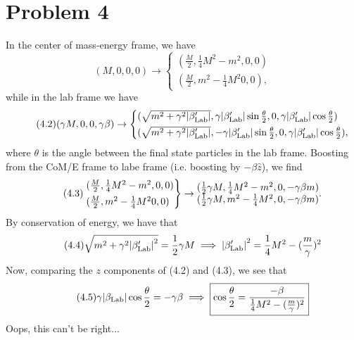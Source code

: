 \documentclass[12pt]{article}
\begin{document}
\section*{Problem 4}
In the center of mass-energy frame, we have 
\begin{equation*} \tag{4.1}
    (M, 0, 0, 0) \rightarrow 
    \begin{cases*}
        (\frac{M}{2}, \frac{1}{4}M^2 - m^2, 0, 0) \\
        (\frac{M}{2}, m^2 - \frac{1}{4}M^2 0, 0),    
    \end{cases*}
\end{equation*}
while in the lab frame we have
\begin{equation*} \tag{4.2}
    (\gamma M, 0, 0, \gamma\beta) \rightarrow 
    \begin{cases*}
        (\sqrt{m^2 + \gamma^2\abs{\beta_\text{Lab}'}}, \gamma\abs{\beta_\text{Lab}'}\sin\frac{\theta}{2}, 0, \gamma\abs{\beta_\text{Lab}'}\cos\frac{\theta}{2}) \\
        (\sqrt{m^2 + \gamma^2\abs{\beta_\text{Lab}'}}, -\gamma\abs{\beta_\text{Lab}'}\sin\frac{\theta}{2}, 0, \gamma\abs{\beta_\text{Lab}'}\cos\frac{\theta}{2}),
    \end{cases*}
\end{equation*}
where $\theta$ is the angle between the final state particles in the lab frame. Boosting from the CoM/E frame to labe frame (i.e. boosting by $-\beta \hat{z}$), we find
\begin{equation*} \tag{4.3}
    \begin{rcases*}
        (\frac{M}{2}, \frac{1}{4}M^2 - m^2, 0, 0) \\
        (\frac{M}{2}, m^2 - \frac{1}{4}M^2 0, 0)  
    \end{rcases*} 
    \rightarrow \mqty{(\frac{1}{2}\gamma M, \frac{1}{4}M^2 - m^2, 0, -\gamma\beta m) \\ (\frac{1}{2}\gamma M, m^2 - \frac{1}{4}M^2, 0, -\gamma\beta m)}.
\end{equation*}
By conservation of energy, we have that 
\begin{equation*} \tag{4.4}
    \sqrt{m^2 + \gamma^2\abs{\beta_\text{Lab}'}^2} = \frac{1}{2}\gamma M \implies \abs{\beta_\text{Lab}'}^2 = \frac{1}{4}M^2 - (\frac{m}{\gamma})^2
\end{equation*}
Now, comparing the $z$ components of (4.2) and (4.3), we see that
\begin{align*} \tag{4.5}
    \gamma \abs{\beta_\text{Lab}} \cos\frac{\theta}{2} = -\gamma\beta \implies \boxed{\cos\frac{\theta}{2} = \frac{-\beta}{\frac{1}{4}M^2 - (\frac{m}{\gamma})^2}} 
\end{align*}
Oops, this can't be right...
\end{document}
